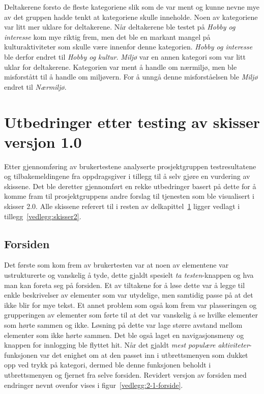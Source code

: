 Deltakerene forsto de fleste kategoriene slik som de var ment og kunne nevne mye av det gruppen hadde tenkt at kategoriene skulle inneholde. Noen av kategoriene var litt mer uklare for deltakerene. Når deltakerene ble testet på {\em Hobby og interesse} kom mye riktig frem, men det ble en markant mangel på kulturaktiviteter som skulle være innenfor denne kategorien. {\em Hobby og interesse} ble derfor endret til {\em Hobby og kultur}. {\em Miljø} var en annen kategori som var litt uklar for deltakerene. Kategorien var ment å handle om nærmiljø, men ble misforstått til å handle om miljøvern. For å unngå denne misforståelsen ble {\em Miljø} endret til {\em Nærmiljø}.


\section{Utbedringer etter testing av skisser versjon 1.0}
\label{section:utbedringer-skisser-1}

Etter gjennomføring av brukertestene analyserte prosjektgruppen testresultatene og tilbakemeldingene fra oppdragsgiver i tillegg til å selv gjøre en vurdering av skissene. Det ble deretter gjennomført en rekke utbedringer basert på dette for å komme fram til prosjektgruppens andre forslag til tjenesten som ble visualisert i skisser 2.0. Alle skissene referert til i resten av delkapittel~\ref{section:utbedringer-skisser-1} ligger vedlagt i tillegg~\ref{vedlegg:skisser2}.

\subsection{Forsiden}

Det første som kom frem av brukertesten var at noen av elementene var ustrukturerte og vanskelig å tyde, dette gjaldt spesielt {\em  ta testen}-knappen og hva man kan foreta seg på forsiden. Et av tiltakene for å løse dette var å legge til enkle beskrivelser av elementer som var utydelige, men samtidig passe på at det ikke blir for mye tekst. Et annet problem som også kom frem var plasseringen og grupperingen av elementer som førte til at det var vanskelig å se hvilke elementer som hørte sammen og ikke. Løsning på dette var lage større avstand mellom elementer som ikke hørte sammen. Det ble også laget en navigasjonsmeny og knappen for innlogging ble flyttet hit. Når det gjaldt {\em  mest populære aktiviteter}-funksjonen var det enighet om at den passet inn i utbrettsmenyen som dukket opp ved trykk på kategori, dermed ble denne funksjonen beholdt i utbrettsmenyen og fjernet fra selve forsiden. Revidert versjon av forsiden med endringer nevnt ovenfor vises i figur~\ref{vedlegg:2-1-forside}.


